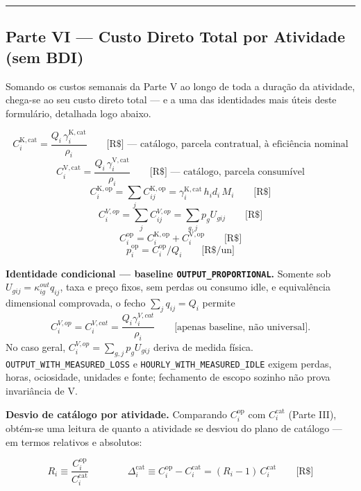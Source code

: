 \documentclass[
  10pt,
]{article}
\begin{document}
\begin{center}\rule{0.5\linewidth}{0.5pt}\end{center}

\hypertarget{parte-vi-custo-direto-total-por-atividade-sem-bdi}{%
\subsection{Parte VI --- Custo Direto Total por Atividade (sem
BDI)}\label{parte-vi-custo-direto-total-por-atividade-sem-bdi}}

Somando os custos semanais da Parte V ao longo de toda a duração da
atividade, chega-se ao seu custo direto total --- e a uma das
identidades mais úteis deste formulário, detalhada logo abaixo.

\[C_i^{\mathrm{K,cat}} = \frac{Q_i\,\gamma_i^{\mathrm{K,cat}}}{\rho_i}\qquad\text{[R\$] — catálogo, parcela contratual, à eficiência nominal}\]
\[C_i^{\mathrm{V,cat}} = \frac{Q_i\,\gamma_i^{\mathrm{V,cat}}}{\rho_i}\qquad\text{[R\$] — catálogo, parcela consumível}\]
\[C_i^{\mathrm{K,op}} = \sum_{j} C_{ij}^{\mathrm{K,op}} = \gamma_i^{\mathrm{K,cat}}\,h_id_i\,M_i\qquad\text{[R\$]}\]
\[C_i^{V,op}=\sum_j C_{ij}^{V,op}=\sum_{g,j}p_g U_{gij}\qquad\text{[R\$]}\]
\[C_i^{\mathrm{op}} = C_i^{\mathrm{K,op}}+C_i^{\mathrm{V,op}}\qquad\text{[R\$]}\]
\[p_i^{\mathrm{op}} = C_i^{\mathrm{op}}/Q_i\qquad\text{[R\$/un]}\]

\textbf{Identidade condicional --- baseline \texttt{OUTPUT\_PROPORTIONAL}.}
Somente sob \(U_{gij}=\kappa_{ig}^{out}q_{ij}\), taxa e preço fixos, sem perdas ou consumo idle, e equivalência dimensional comprovada, o fecho \(\sum_jq_{ij}=Q_i\) permite
\[\boxed{C_i^{V,op}=C_i^{V,cat}=\frac{Q_i\gamma_i^{V,cat}}{\rho_i}}\qquad\text{[apenas baseline, não universal].}\]
No caso geral, \(C_i^{V,op}=\sum_{g,j}p_gU_{gij}\) deriva de medida física. \texttt{OUTPUT\_WITH\_MEASURED\_LOSS} e \texttt{HOURLY\_WITH\_MEASURED\_IDLE} exigem perdas, horas, ociosidade, unidades e fonte; fechamento de escopo sozinho não prova invariância de V.

\textbf{Desvio de catálogo por atividade.} Comparando
\(C_i^{\mathrm{op}}\) com \(C_i^{\mathrm{cat}}\) (Parte III), obtém-se
uma leitura de quanto a atividade se desviou do plano de catálogo --- em
termos relativos e absolutos:

\[R_i \equiv \frac{C_i^{\mathrm{op}}}{C_i^{\mathrm{cat}}} \qquad\qquad \boxed{\Delta_i^{\mathrm{cat}} \equiv C_i^{\mathrm{op}}-C_i^{\mathrm{cat}} = (R_i-1)\,C_i^{\mathrm{cat}}}\qquad\text{[R\$]}\]
\end{document}
